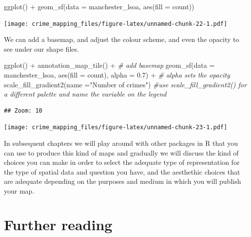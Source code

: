 \documentclass[
]{book}
\newenvironment{Shaded}{\begin{snugshade}}{\end{snugshade}}
\newcommand{\AttributeTok}[1]{\textcolor[rgb]{0.77,0.63,0.00}{#1}}
\newcommand{\CommentTok}[1]{\textcolor[rgb]{0.56,0.35,0.01}{\textit{#1}}}
\newcommand{\FloatTok}[1]{\textcolor[rgb]{0.00,0.00,0.81}{#1}}
\newcommand{\FunctionTok}[1]{\textcolor[rgb]{0.00,0.00,0.00}{#1}}
\newcommand{\NormalTok}[1]{#1}
\newcommand{\SpecialCharTok}[1]{\textcolor[rgb]{0.00,0.00,0.00}{#1}}
\newcommand{\StringTok}[1]{\textcolor[rgb]{0.31,0.60,0.02}{#1}}
\begin{document}
\begin{Shaded}
\begin{Highlighting}[]
\FunctionTok{ggplot}\NormalTok{() }\SpecialCharTok{+} 
\FunctionTok{geom\_sf}\NormalTok{(}\AttributeTok{data =}\NormalTok{ manchester\_lsoa, }\FunctionTok{aes}\NormalTok{(}\AttributeTok{fill =}\NormalTok{ count))}
\end{Highlighting}
\end{Shaded}

\texttt{[image: crime\_mapping\_files/figure-latex/unnamed-chunk-22-1.pdf]}

We can add a basemap, and adjust the colour scheme, and even the opacity to see under our shape files.

\begin{Shaded}
\begin{Highlighting}[]
\FunctionTok{ggplot}\NormalTok{() }\SpecialCharTok{+} 
  \FunctionTok{annotation\_map\_tile}\NormalTok{() }\SpecialCharTok{+}  \CommentTok{\# add basemap}
\FunctionTok{geom\_sf}\NormalTok{(}\AttributeTok{data =}\NormalTok{ manchester\_lsoa, }\FunctionTok{aes}\NormalTok{(}\AttributeTok{fill =}\NormalTok{ count), }\AttributeTok{alpha =} \FloatTok{0.7}\NormalTok{) }\SpecialCharTok{+} \CommentTok{\# alpha sets the opacity}
  \FunctionTok{scale\_fill\_gradient2}\NormalTok{(}\AttributeTok{name =}\StringTok{"Number of crimes"}\NormalTok{) }\CommentTok{\#use scale\_fill\_gradient2() for a different palette and name the variable on the legend}
\end{Highlighting}
\end{Shaded}

\begin{verbatim}
## Zoom: 10
\end{verbatim}

\texttt{[image: crime\_mapping\_files/figure-latex/unnamed-chunk-23-1.pdf]}

In subsequent chapters we will play around with other packages in R that you can use to produce this kind of maps and gradually we will discuss the kind of choices you can make in order to select the adequate type of representation for the type of spatial data and question you have, and the aesthethic choices that are adequate depending on the purposes and medium in which you will publish your map.

\hypertarget{further-reading}{%
\section{Further reading}\label{further-reading}}
\end{document}
